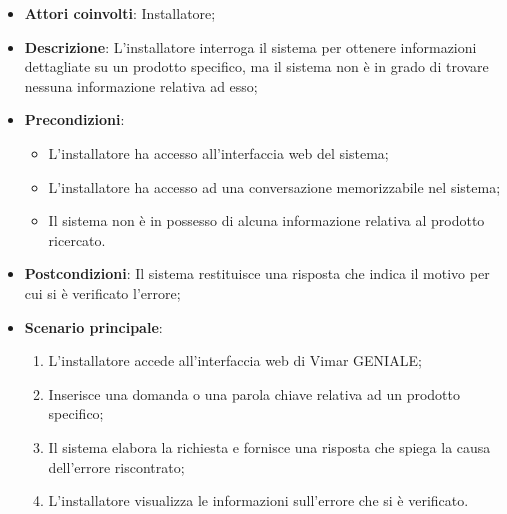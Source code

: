 \begin{itemize}
    \item \textbf{Attori coinvolti}: Installatore;
    \item \textbf{Descrizione}: L’installatore interroga il sistema per ottenere informazioni dettagliate su un prodotto specifico, ma il sistema non è in grado di trovare nessuna informazione relativa ad esso;
    \item \textbf{Precondizioni}: 
        \begin{itemize}
            \item L’installatore ha accesso all’interfaccia web del sistema;
            \item L’installatore ha accesso ad una conversazione memorizzabile nel sistema;
            \item Il sistema non è in possesso di alcuna informazione relativa al prodotto ricercato.
        \end{itemize}
    \item \textbf{Postcondizioni}: Il sistema restituisce una risposta che indica il motivo per cui si è verificato l’errore;
    \item \textbf{Scenario principale}:
    \begin{enumerate}
    \item L’installatore accede all’interfaccia web di Vimar GENIALE;
    \item Inserisce una domanda o una parola chiave relativa ad un prodotto specifico;
    \item Il sistema elabora la richiesta e fornisce una risposta che spiega la causa dell'errore riscontrato;
    \item L’installatore visualizza le informazioni sull’errore che si è verificato.
    \end{enumerate}
\end{itemize}

